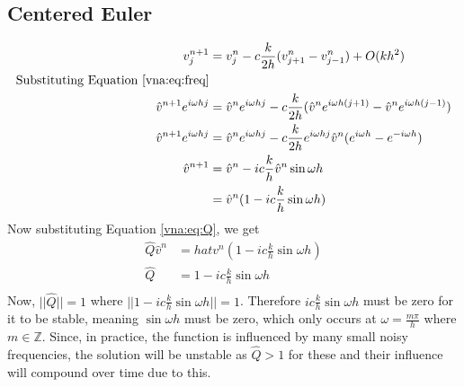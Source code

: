 \subsection{Centered Euler}
\begin{equation*}
\begin{align}
    v_j^{n+1}	&= v_j^n - c\frac{k}{2h}(v_{j+1}^n - v_{j-1}^n) + O(kh^2)	\\
    \text{Substituting Equation \ref{vna:eq:freq}} 				\\
    \hat{v}^{n+1}e^{i\omega hj} &= \hat{v}^ne^{i\omega hj} - c\frac{k}{2h} (\hat{v}^ne^{i\omega h(j+1)} - \hat{v}^ne^{i\omega h(j-1)})						    \\
    \hat{v}^{n+1}e^{i\omega hj} &= \hat{v}^ne^{i\omega hj} - c\frac{k}{2h} e^{i\omega hj} \hat{v}^n (e^{i\omega h} - e^{-i\omega h})							    \\
    \hat{v}^{n+1} &= \hat{v}^n - ic\frac{k}{h} \hat{v}^n \sin{\omega h}		\\
		  &= \hat{v}^n(1 - ic\frac{k}{h} \sin{\omega h})
\end{align}
\end{equation*}
Now substituting Equation \ref{vna:eq:Q}, we get
\begin{equation*}
\begin{align}
    \hat{Q}\hat{v}^n &= hat{v}^n(1 - ic\frac{k}{h} \sin{\omega h})	\\
    \hat{Q} &= 1 - ic\frac{k}{h} \sin{\omega h}				\\
\end{align}
\end{equation*}
Now, $||\hat{Q}|| = 1$ where $||1 - ic\frac{k}{h} \sin{\omega h}|| = 1$. Therefore $ic\frac{k}{h} \sin{\omega h}$ must be zero for it to be stable, meaning $\sin{\omega h}$ must be zero, which only occurs at $\omega=\frac{m\pi}{h}$ where $m \in \mathbb{Z}$. Since, in practice, the function is influenced by many small noisy frequencies, the solution will be unstable as $\hat{Q}>1$ for these and their influence will compound over time due to this.
